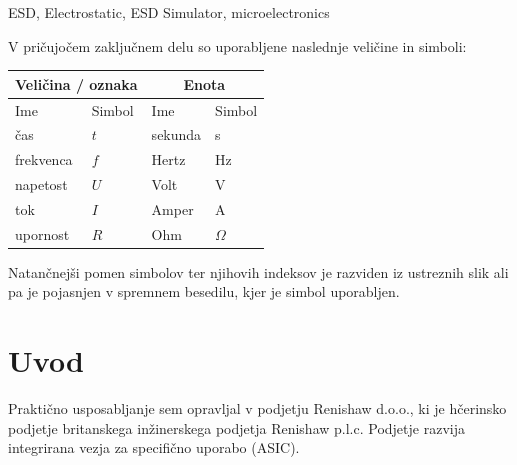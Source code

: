 \documentclass[a4paper,twoside,openright,12pt,Slovene]{book}
\begin{document}
\keywords
ESD, Electrostatic, ESD Simulator, microelectronics


\tableofcontents

\seznamslik
\seznamtabel

\seznamsimbolov
V pričujočem zaključnem delu so uporabljene naslednje veličine in simboli:

\begin{center}
    \begin{tabular}{*{4}{l}} \hline
        \multicolumn{2}{c}{\bf{Veličina / oznaka}}           & \multicolumn{2}{c}{\bf{Enota}} \\ \hline
        Ime                & Simbol                          & Ime      & Simbol              \\ \hline
        čas                & $t$                             & sekunda  & s                   \\
        frekvenca          & $f$                             & Hertz    & Hz                  \\
        napetost           & $U$                             & Volt     & V                  \\
        tok                & $I$                             & Amper    & A                   \\
        upornost           & $R$                             & Ohm      & $\Omega$            \\ \hline

    \end{tabular}
\end{center} 

\noindent
Natančnejši pomen simbolov ter njihovih indeksov je razviden iz ustreznih slik ali pa je pojasnjen v spremnem besedilu, kjer je simbol uporabljen.

\mainmatter

\chapter{Uvod} \label{uvod}

Praktično usposabljanje sem opravljal v podjetju Renishaw d.o.o., ki je hčerinsko podjetje britanskega inžinerskega podjetja Renishaw p.l.c.  Podjetje razvija integrirana vezja za specifično uporabo (ASIC). 
\end{document}
